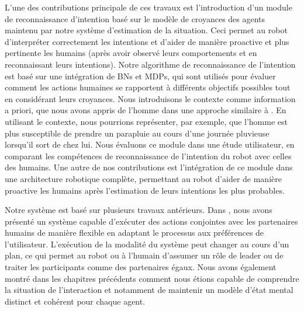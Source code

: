 \documentclass[a4paper,11pt,twoside]{StyleThese}
\begin{document}
L'une des contributions principale de ces travaux est l'introduction d'un module de reconnaissance d'intention basé sur le modèle de croyances des agents maintenu par notre système d'estimation de la situation. Ceci permet au robot d'interpréter correctement les intentions et d'aider de manière proactive et plus pertinente les humains (après avoir observé leurs comportements et en reconnaissant leurs intentions).
Notre algorithme de reconnaissance de l'intention est basé sur une intégration de BNs et MDPs, qui sont utilisés pour évaluer comment les actions humaines se rapportent à différents objectifs possibles tout en considérant leurs croyances. Nous introduisons le contexte comme information a priori, que nous avons appris de l'homme dans une approche similaire à \cite{Liu2014}. En utilisant le contexte, nous pourrions représenter, par exemple, que l'homme est plus susceptible de prendre un parapluie au cours d'une journée pluvieuse lorsqu'il sort de chez lui. Nous évaluons ce module dans une étude utilisateur, en comparant les compétences de reconnaissance de l'intention du robot avec celles des humains. Une autre de nos contributions est l'intégration de ce module dans une architecture robotique complète, permettant au robot d'aider de manière proactive les humains après l'estimation de leurs intentions les plus probables.

Notre système est basé sur plusieurs travaux antérieurs. Dans \cite{fioreiser2014}, nous avons présenté un système capable d'exécuter des actions conjointes avec les partenaires humains de manière flexible en adaptant le processus aux préférences de l'utilisateur. L'exécution de la modalité du système peut changer au cours d'un plan, ce qui permet au robot ou à l'humain d'assumer un rôle de leader ou de traiter les participants comme des partenaires égaux. Nous avons également montré dans les chapitres précédents comment nous étions capable de comprendre la situation de l'interaction et notamment de maintenir un modèle d'état mental distinct et cohérent pour chaque agent.

\end{document}
